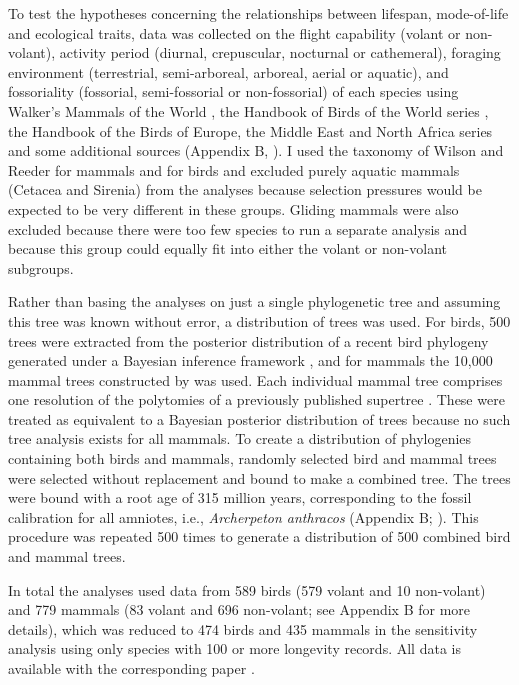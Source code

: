 To test the hypotheses concerning the relationships between lifespan, mode-of-life and ecological traits, data was collected on the flight capability (volant or non-volant), activity period (diurnal, crepuscular, nocturnal or cathemeral), foraging environment (terrestrial, semi-arboreal, arboreal, aerial or aquatic), and fossoriality (fossorial, semi-fossorial or non-fossorial) of each species using Walker's Mammals of the World \citep{nowak1999walker}, the Handbook of Birds of the World series \citep{hoyo1992handbook}, the Handbook of the Birds of Europe, the Middle East and North Africa series \citep{cramp1977handbook} and some additional sources (Appendix B, \citep{fry2010kingfishers,parr2010parrots,williams1995penguins}). I used the taxonomy of Wilson and Reeder \citep{wilson2005mammal} for mammals and \cite{jetz2012global} for birds and excluded purely aquatic mammals (Cetacea and Sirenia) from the analyses because selection pressures would be expected to be very different in these groups. Gliding mammals were also excluded because there were too few species to run a separate analysis and because this group could equally fit into either the volant or non-volant subgroups.


Rather than basing the analyses on just a single phylogenetic tree and assuming this tree was known without error, a distribution of trees was used. For birds, 500 trees were extracted from the posterior distribution of a recent bird phylogeny generated under a Bayesian inference framework \citep{jetz2012global}, and for mammals the 10,000 mammal trees constructed by \cite{kuhn2011simple} was used. Each individual mammal tree comprises one resolution of the polytomies of a previously published supertree \citep{bininda2007delayed}. These were treated as equivalent to a Bayesian posterior distribution of trees because no such tree analysis exists for all mammals. To create a distribution of phylogenies containing both birds and mammals, randomly selected bird and mammal trees were selected without replacement and bound to make a combined tree. The trees were bound with a root age of 315 million years, corresponding to the fossil calibration for all amniotes, i.e., \textit{Archerpeton anthracos} (Appendix B; \citep{reisz2004molecular}). This procedure was repeated 500 times to generate a distribution of 500 combined bird and mammal trees.


In total the analyses used data from 589 birds (579 volant and 10 non-volant) and 779 mammals (83 volant and 696 non-volant; see Appendix B for more details), which was reduced to 474 birds and 435 mammals in the sensitivity analysis using only species with 100 or more longevity records. All data is available with the corresponding paper \citep{healy2014ecology}.

